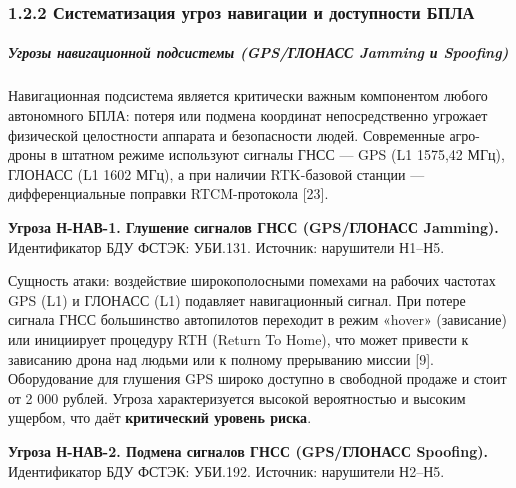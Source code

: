 \hypertarget{ux441ux438ux441ux442ux435ux43cux430ux442ux438ux437ux430ux446ux438ux44f-ux443ux433ux440ux43eux437-ux43dux430ux432ux438ux433ux430ux446ux438ux438-ux438-ux434ux43eux441ux442ux443ux43fux43dux43eux441ux442ux438-ux431ux43fux43bux430}{%
\subsubsection{1.2.2 Систематизация угроз навигации и доступности БПЛА}\label{ux441ux438ux441ux442ux435ux43cux430ux442ux438ux437ux430ux446ux438ux44f-ux443ux433ux440ux43eux437-ux43dux430ux432ux438ux433ux430ux446ux438ux438-ux438-ux434ux43eux441ux442ux443ux43fux43dux43eux441ux442ux438-ux431ux43fux43bux430}}

\hypertarget{ux443ux433ux440ux43eux437ux44b-ux43dux430ux432ux438ux433ux430ux446ux438ux43eux43dux43dux43eux439-ux43fux43eux434ux441ux438ux441ux442ux435ux43cux44b-gpsux433ux43bux43eux43dux430ux441ux441-jamming-ux438-spoofing}{%
\subparagraph{Угрозы навигационной подсистемы (GPS/ГЛОНАСС Jamming и Spoofing)}\label{ux443ux433ux440ux43eux437ux44b-ux43dux430ux432ux438ux433ux430ux446ux438ux43eux43dux43dux43eux439-ux43fux43eux434ux441ux438ux441ux442ux435ux43cux44b-gpsux433ux43bux43eux43dux430ux441ux441-jamming-ux438-spoofing}}

Навигационная подсистема является критически важным компонентом любого автономного БПЛА: потеря или подмена координат непосредственно угрожает физической целостности аппарата и безопасности людей. Современные агро-дроны в штатном режиме используют сигналы ГНСС --- GPS (L1 1575,42 МГц), ГЛОНАСС (L1 1602 МГц), а при наличии RTK-базовой станции --- дифференциальные поправки RTCM-протокола {[}23{]}.

\textbf{Угроза Н-НАВ-1. Глушение сигналов ГНСС (GPS/ГЛОНАСС Jamming).} Идентификатор БДУ ФСТЭК: УБИ.131. Источник: нарушители Н1--Н5.

Сущность атаки: воздействие широкополосными помехами на рабочих частотах GPS (L1) и ГЛОНАСС (L1) подавляет навигационный сигнал. При потере сигнала ГНСС большинство автопилотов переходит в режим «hover» (зависание) или инициирует процедуру RTH (Return To Home), что может привести к зависанию дрона над людьми или к полному прерыванию миссии {[}9{]}. Оборудование для глушения GPS широко доступно в свободной продаже и стоит от 2 000 рублей. Угроза характеризуется высокой вероятностью и высоким ущербом, что даёт \textbf{критический уровень риска}.

\textbf{Угроза Н-НАВ-2. Подмена сигналов ГНСС (GPS/ГЛОНАСС Spoofing).} Идентификатор БДУ ФСТЭК: УБИ.192. Источник: нарушители Н2--Н5.

